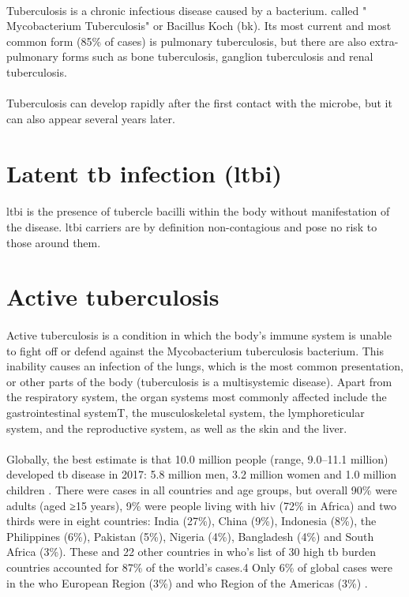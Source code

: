 \paragraph{}
Tuberculosis is a chronic infectious disease caused by a bacterium. called " Mycobacterium Tuberculosis" or Bacillus Koch (\ac{bk}). Its most current and most common form (85\% of cases) is pulmonary tuberculosis, but there are also extra-pulmonary forms such as bone tuberculosis, ganglion tuberculosis and renal tuberculosis.
\paragraph{}
Tuberculosis can develop rapidly after the first contact with the microbe, but it can also appear several years later.
\section{Latent \ac{tb} infection (\ac{ltbi})}
\paragraph{}
\ac{ltbi} is the presence of tubercle bacilli within the body without manifestation of the disease. \ac{ltbi} carriers are by definition non-contagious and pose no risk to those around them.
\section{Active tuberculosis}
\paragraph{}
Active tuberculosis is a condition in which the body’s immune system is unable to fight off or defend against the Mycobacterium tuberculosis bacterium. This inability causes an infection of the lungs, which is the most common presentation, or other parts of the body (tuberculosis is a multisystemic disease). Apart from the respiratory system, the organ systems most commonly affected include the gastrointestinal systemT, the musculoskeletal system, the lymphoreticular system, and the reproductive system, as well as the skin and the liver.
\paragraph{}
Globally, the best estimate is that 10.0 million people (range, 9.0–11.1 million) developed \ac{tb} disease in 2017: 5.8 million men, 3.2 million women and 1.0 million children \cite{TBT:3}. There were cases in all countries and age groups, but overall 90\% were adults (aged ≥15 years), 9\% were people living with \ac{hiv} (72\% in Africa) and two thirds were in eight countries: India (27\%), China (9\%), Indonesia (8\%), the Philippines (6\%), Pakistan (5\%), Nigeria (4\%), Bangladesh (4\%) and South Africa (3\%). These and 22 other countries in \ac{who}’s list of 30 high \ac{tb} burden countries accounted for 87\% of the world’s cases\cite{TBT:3}.4 Only 6\% of global cases were in the \ac{who} European Region (3\%) and \ac{who} Region of the Americas (3\%)
\cite{TBT:3}.
\newpage
